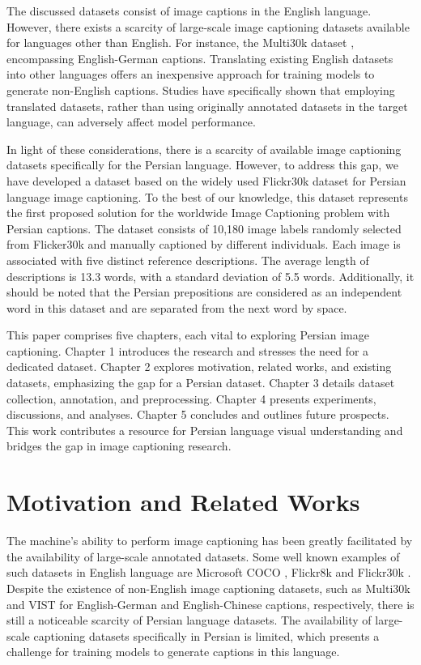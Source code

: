 \documentclass[runningheads]{llncs}
\begin{document}
The discussed datasets consist of image captions in the English language. However, there exists a scarcity of large-scale image captioning datasets available for languages other than English. For instance, the Multi30k dataset \cite{Multi30k}, encompassing English-German captions. Translating existing English datasets into other languages offers an inexpensive approach for training models to generate non-English captions. Studies \cite{Xue,Zoph,Rosa} have specifically shown that employing translated datasets, rather than using originally annotated datasets in the target language, can adversely affect model performance.

In light of these considerations, there is a scarcity of available image captioning datasets specifically for the Persian language. However, to address this gap, we have developed a dataset based on the widely used Flickr30k dataset \cite{Flickr30k} for Persian language image captioning. To the best of our knowledge, this dataset represents the first proposed solution for the worldwide Image Captioning problem with Persian captions. The dataset consists of 10,180 image labels randomly selected from Flicker30k and manually captioned by different individuals. Each image is associated with five distinct reference descriptions. The average length of descriptions is 13.3 words, with a standard deviation of 5.5 words. Additionally, it should be noted that the Persian prepositions are considered as an independent word in this dataset and are separated from the next word by space.

This paper comprises five chapters, each vital to exploring Persian image captioning. Chapter 1 introduces the research and stresses the need for a dedicated dataset. Chapter 2 explores motivation, related works, and existing datasets, emphasizing the gap for a Persian dataset. Chapter 3 details dataset collection, annotation, and preprocessing. Chapter 4 presents experiments, discussions, and analyses. Chapter 5 concludes and outlines future prospects. This work contributes a resource for Persian language visual understanding and bridges the gap in image captioning research.

\section{Motivation and Related Works}
The machine's ability to perform image captioning has been greatly facilitated by the availability of large-scale annotated datasets. Some well known examples of such datasets in English language are Microsoft COCO \cite{MSCOCO}, Flickr8k \cite{Flickr8k} and Flickr30k \cite{Flickr30k}. Despite the existence of non-English image captioning datasets, such as Multi30k \cite{Multi30k} and VIST \cite{VIST} for English-German and English-Chinese captions, respectively, there is still a noticeable scarcity of Persian language datasets. The availability of large-scale captioning datasets specifically in Persian is limited, which presents a challenge for training models to generate captions in this language.
\end{document}
